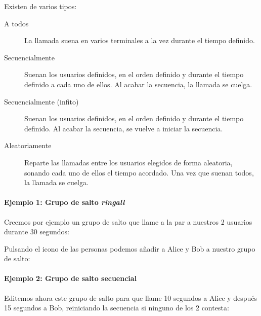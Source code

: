 \documentclass[letterpaper,10pt,spanish]{sphinxmanual}
\begin{document}
Existen de varios tipos:
\begin{description}
\item[{A todos}] \leavevmode{}\label{pbx_features/huntgroups:term-ring-all}
La llamada suena en varios terminales a la vez durante el tiempo definido.

\item[{Secuencialmente}] \leavevmode{}\label{pbx_features/huntgroups:term-sequential}
Suenan los usuarios definidos, en el orden definido y durante el tiempo definido a cada uno de ellos. Al acabar la secuencia, la llamada se cuelga.

\item[{Secuencialmente (infito)}] \leavevmode{}\label{pbx_features/huntgroups:term-sequential-infinite}
Suenan los usuarios definidos, en el orden definido y durante el tiempo definido. Al acabar la secuencia, se vuelve a iniciar la secuencia.

\item[{Aleatoriamente}] \leavevmode{}\label{pbx_features/huntgroups:term-random}
Reparte las llamadas entre los usuarios elegidos de forma aleatoria, sonando cada uno de ellos el tiempo acordado. Una vez que suenan todos, la llamada se cuelga.

\end{description}
\paragraph{Ejemplo 1: Grupo de salto \emph{ringall}}

Creemos por ejemplo un grupo de salto que llame a la par a nuestros 2 usuarios durante 30 segundos:

\noindent{}

Pulsando el icono de las personas podemos añadir a Alice y Bob a nuestro grupo de salto:

\noindent{}
\paragraph{Ejemplo 2: Grupo de salto secuencial}

Editemos ahora este grupo de salto para que llame 10 segundos a Alice y después 15 segundos a Bob, reiniciando la secuencia si ninguno de los 2 contesta:
\end{document}
